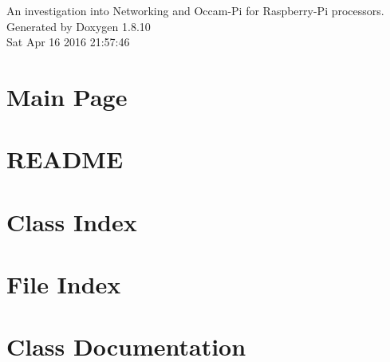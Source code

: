 \documentclass[twoside]{book}
\newcommand{\+}{\discretionary{\mbox{\scriptsize$\hookleftarrow$}}{}{}}
\newcommand{\clearemptydoublepage}{%
  \newpage{\pagestyle{empty}\cleardoublepage}%
}
\begin{document}
\hypersetup{pageanchor=false,
             bookmarks=true,
             bookmarksnumbered=true,
             pdfencoding=unicode
            }
\begin{titlepage}
\vspace*{7cm}
\begin{center}%
{\Large An investigation into Networking and Occam-\/\+Pi for Raspberry-\/\+Pi processors. }\\
\vspace*{1cm}
{\large Generated by Doxygen 1.8.10}\\
\vspace*{0.5cm}
{\small Sat Apr 16 2016 21:57:46}\\
\end{center}
\end{titlepage}
\clearemptydoublepage
\tableofcontents
\clearemptydoublepage
{}
\hypersetup{pageanchor=true}

\chapter{Main Page}
\label{index}\hypertarget{index}{}
\chapter{R\+E\+A\+D\+M\+E}
\label{md__r_e_a_d_m_e}
\hypertarget{md__r_e_a_d_m_e}{}

\chapter{Class Index}

\chapter{File Index}

\chapter{Class Documentation}























\end{document}
